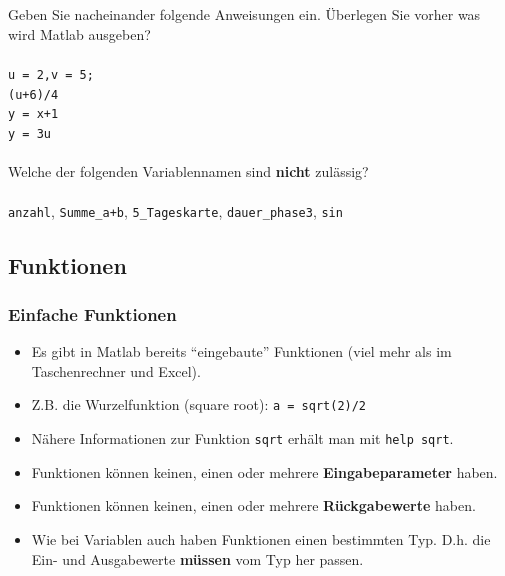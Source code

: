     \subsection{\mexercise}
    \begin{frame}
      \frametitle{\mexercise}
      \begin{exercise}
          Geben Sie nacheinander folgende Anweisungen ein. Überlegen Sie vorher was wird Matlab ausgeben? \\ \\
          \texttt{u = 2,v = 5;} \keys{\return}\\
          \texttt{(u+6)/4} \keys{\return}\\
          \texttt{y = x+1} \keys{\return}\\
          \texttt{y = 3u} \keys{\return}\\ \\
          Welche der folgenden Variablennamen sind \textbf{nicht} zulässig? \\ \\
          \texttt{anzahl}, \texttt{Summe\_a+b}, \texttt{5\_Tageskarte}, \texttt{dauer\_phase3}, \texttt{sin}
      \end{exercise}
  \end{frame}

  \subsection{Funktionen}
  \begin{frame}
    \frametitle{Einfache Funktionen}
    \begin{itemize}
      \item Es gibt in Matlab bereits ``eingebaute'' Funktionen (viel mehr als im Taschenrechner und Excel).
      \item Z.B. die Wurzelfunktion (square root): \texttt{a = sqrt(2)/2}
      \item Nähere Informationen zur Funktion \texttt{sqrt} erhält man mit \texttt{help sqrt}.
      \item Funktionen können keinen, einen oder mehrere \textbf{Eingabeparameter} haben.
      \item Funktionen können keinen, einen oder mehrere \textbf{Rückgabewerte} haben.
      \item Wie bei Variablen auch haben Funktionen einen bestimmten Typ. D.h. die Ein- und Ausgabewerte \textbf{müssen} vom Typ her passen.
    \end{itemize}
  \end{frame}

